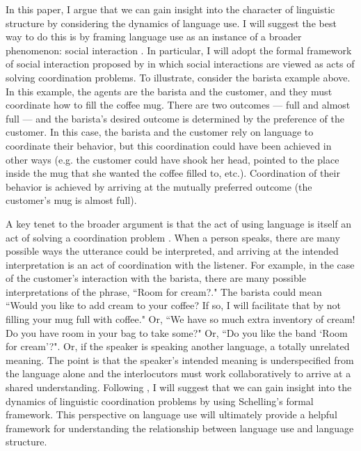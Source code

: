 \documentclass[man, noapacite, 12pt]{apa2}
\begin{document}
In this paper, I argue that we can gain  insight into the character of linguistic structure by considering the dynamics of language use. I will suggest the best way to do this is by framing language use as an instance of a broader phenomenon: social interaction \cite{clark1996using}. In particular, I will adopt the formal framework of social interaction proposed by  in which social interactions are viewed as acts of solving coordination problems.  To illustrate, consider the barista example above. In this example, the agents are the barista and the customer, and they must coordinate how  to fill the coffee mug. There are two outcomes --- full and almost full --- and the barista's desired outcome is determined by the preference of the customer. In this case, the barista and the customer rely on language to coordinate their behavior, but this coordination could have been achieved in other ways (e.g. the customer could have shook her head, pointed to the place inside the mug that she wanted the coffee filled to, etc.). Coordination of their behavior is achieved  by arriving at the mutually preferred outcome (the customer's mug is almost full).

A key tenet to the broader argument is that the act of using language is itself an act of solving a coordination problem \cite{clark1996using}. When a person speaks, there are many possible ways the utterance could be interpreted, and arriving at the intended interpretation is an act of coordination with the listener. For example, in the case of the customer's interaction with the barista, there are many possible interpretations of the phrase, ``Room for cream?." The barista could mean ``Would you like to add cream to your coffee? If so, I will facilitate that by not filling your mug full with coffee." Or, ``We have so much extra inventory of cream! Do you have room in your bag to take some?" Or, ``Do you like the band `Room for cream'?". Or, if the speaker is speaking another language, a totally unrelated meaning. The point is that the speaker's intended meaning is underspecified from the language alone and the interlocutors must work collaboratively to arrive at a shared understanding. Following , I will suggest that we can gain insight into the dynamics of linguistic coordination problems by using Schelling's formal framework.  This perspective on language use will ultimately provide a helpful framework for understanding the relationship between language use and language structure.
\end{document}
